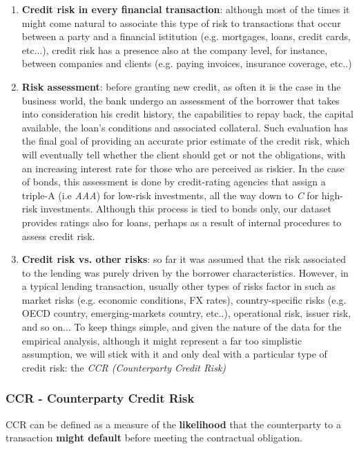 \documentclass[a4paper,12pt]{article}
\begin{document}
        \begin{enumerate}
            \item \textbf{Credit risk in every financial transaction}: although most of the times it might come natural to associate this type of risk to transactions that occur between a party and a financial istitution (e.g. mortgages, loans, credit cards, etc...), credit risk has a presence also at the company level, for instance, between companies and clients (e.g. paying invoices, insurance coverage, etc..)  
            \item \textbf{Risk assessment}: before granting new credit, as often it is the case in the business world, the bank undergo an assessment of the borrower that takes into consideration his credit history, the capabilities to repay back, the capital available, the loan's conditions and associated collateral. Such evaluation has the final goal of providing an accurate prior estimate of the credit risk, which will eventually tell whether the client should get or not the obligations, with an increasing interest rate for those who are perceived as riskier. In the case of bonds, this assessment is done by credit-rating agencies that assign a triple-A (i.e \textit{AAA}) for low-risk investments, all the way down to \textit{C} for high-risk investments. Although this process is tied to bonds only, our dataset provides ratings also for loans, perhaps as a result of internal procedures to assess credit risk.
            \item \textbf{Credit risk vs. other risks}: so far it was assumed that the risk associated to the lending was purely driven by the borrower characteristics. However, in a typical lending transaction, usually other types of risks factor in such as market risks (e.g. economic conditions, FX rates), country-specific risks (e.g. OECD country, emerging-markets country, etc..), operational risk, issuer risk, and so on... To keep things simple, and given the nature of the data for the empirical analysis, although it might represent a far too simplistic assumption, we will stick with it and only deal with a particular type of credit risk: the \textit{CCR (Counterparty Credit Risk)}
        \end{enumerate}
        
    \subsubsection{CCR - Counterparty Credit Risk}
        \begin{definition}
            CCR can be defined as a measure of the \textbf{likelihood} that the counterparty to a transaction \textbf{might default} before meeting the contractual obligation.
        \end{definition}
\end{document}
